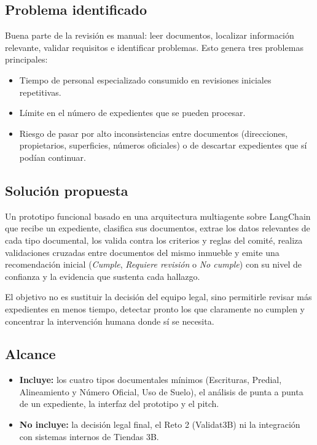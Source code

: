 \documentclass[11pt, a4paper]{article}
\begin{document}
\subsection*{Problema identificado}
Buena parte de la revisión es manual: leer documentos, localizar información relevante, validar requisitos e identificar problemas. Esto genera tres problemas principales:
\begin{itemize}
    \item Tiempo de personal especializado consumido en revisiones iniciales repetitivas.
    \item Límite en el número de expedientes que se pueden procesar.
    \item Riesgo de pasar por alto inconsistencias entre documentos (direcciones, propietarios, superficies, números oficiales) o de descartar expedientes que sí podían continuar.
\end{itemize}

\subsection*{Solución propuesta}
Un prototipo funcional basado en una arquitectura multiagente sobre LangChain que recibe un expediente, clasifica sus documentos, extrae los datos relevantes de cada tipo documental, los valida contra los criterios y reglas del comité, realiza validaciones cruzadas entre documentos del mismo inmueble y emite una recomendación inicial (\textit{Cumple}, \textit{Requiere revisión} o \textit{No cumple}) con su nivel de confianza y la evidencia que sustenta cada hallazgo.

El objetivo no es sustituir la decisión del equipo legal, sino permitirle revisar más expedientes en menos tiempo, detectar pronto los que claramente no cumplen y concentrar la intervención humana donde sí se necesita.

\subsection*{Alcance}
\begin{itemize}
    \item \textbf{Incluye:} los cuatro tipos documentales mínimos (Escrituras, Predial, Alineamiento y Número Oficial, Uso de Suelo), el análisis de punta a punta de un expediente, la interfaz del prototipo y el pitch.
    \item \textbf{No incluye:} la decisión legal final, el Reto 2 (Validat3B) ni la integración con sistemas internos de Tiendas 3B.
\end{itemize}
\end{document}
